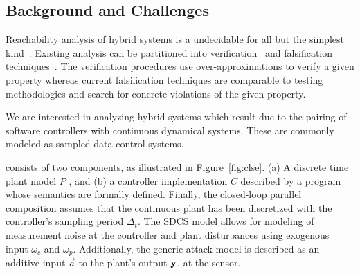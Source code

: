 






\subsection{Background and Challenges}

Reachability analysis of hybrid systems is a undecidable for all but
the simplest kind~\cite{henzinger1995s}. Existing analysis can be
partitioned into verification~\cite{tiwari2012hybridsal,
Chen2012taylor, Frehse+Others/2011/SpaceEx, althoff2016combining,
duggirala2015c2e2} and falsification techniques~\cite{annpureddy2011s,
donze2010breach, dreossi2015efficient}. The verification procedures
use over-approximations to verify a given property whereas current
falsification techniques are comparable to testing methodologies and
search for concrete violations of the given property.

We are interested in analyzing hybrid systems which result due to the
pairing of software controllers with continuous dynamical systems.
These are commonly modeled as sampled data control systems.


 consists of two
components, as illustrated in Figure~\ref{fig:clse}. (a) A discrete
time plant model $P$ , and (b) a controller implementation $C$
described by a program whose semantics are formally defined.  Finally,
the closed-loop parallel composition assumes that the continuous plant
has been discretized with the controller's sampling period $\Delta_t$.
The SDCS model allows for modeling of measurement noise at the
controller and plant disturbances using exogenous input $\omega_c$ and
$\omega_p$. Additionally, the generic attack model is described as an
additive input $\vec{a}$ to the plant's output $\mathbf{y}$, at the sensor.

